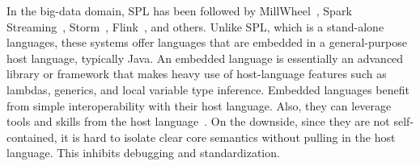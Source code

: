 In the big-data domain, SPL has been followed by
MillWheel~\cite{akidau_et_al_2013}, Spark
Streaming~\cite{zaharia_et_al_2013},
Storm~\cite{toshniwal_et_al_2014}, Flink~\cite{carbone_et_al_2015},
and others.  Unlike SPL, which is a stand-alone languages, these
systems offer languages that are embedded in a general-purpose host
language, typically Java. An embedded language is essentially an
advanced library or framework that makes heavy use of host-language
features such as lambdas, generics, and local variable type
inference. Embedded languages benefit from simple interoperability
with their host language. Also, they can leverage tools and skills
from the host language~\cite{hudak_1998}. On the downside, since they
are not self-contained, it is hard to isolate clear core semantics
without pulling in the host language. This inhibits debugging and
standardization.
